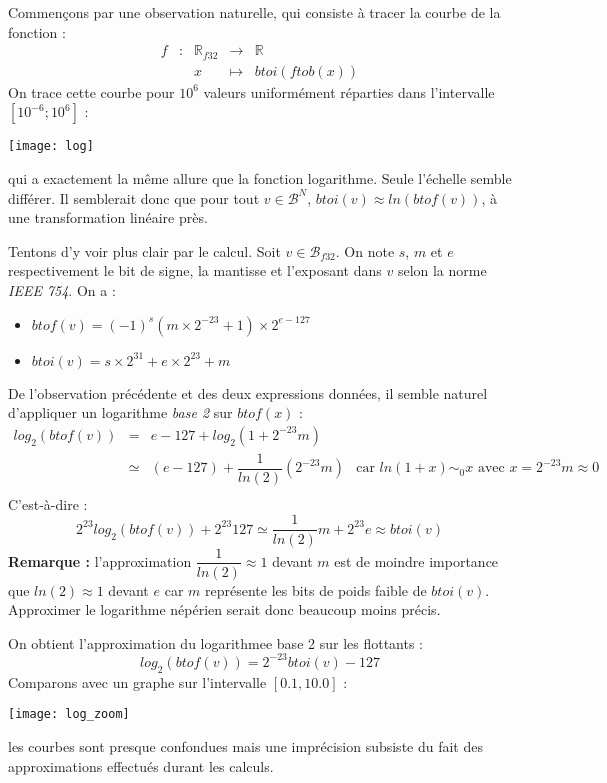 \documentclass[../../main.tex]{subfiles}
\begin{document}
Commençons par une observation naturelle, qui consiste à tracer la courbe de la fonction :
$$
\begin{array}{lclcl}
f & : & \mathbb{R}_{f32} & \rightarrow & \mathbb{R} \\
     &   & x & \mapsto & btoi(ftob(x))
\end{array}
$$
On trace cette courbe pour $10^6$ valeurs uniformément réparties dans l'intervalle $[10^{-6}; 10^6]$ :
\begin{center}
  \texttt{[image: log]}
\end{center}
qui a exactement la même allure que la fonction logarithme. Seule l'échelle semble différer. Il semblerait donc que pour tout $v\in\mathcal{B}^{N}$, $btoi(v)\approx ln(btof(v))$, à une transformation linéaire près.

Tentons d'y voir plus clair par le calcul. Soit $v\in\mathcal{B}_{f32}$. On note $s$, $m$ et $e$ respectivement le bit de signe, la mantisse et l'exposant dans $v$ selon la norme \textit{IEEE 754}. On a :
\begin{itemize}
  \item $btof(v) = (-1)^{s}(m\times{2^{-23}} + 1)\times{2^{e-127}}$
  \item $btoi(v) = s\times{2^{31}} + e\times{2^23} + m$
\end{itemize}
De l'observation précédente et des deux expressions données, il semble naturel d'appliquer un logarithme \textit{base 2} sur $btof(x)$ :
$$\begin{array}{lcll}
log_2(btof(v)) & = & e - 127 + log_2\left(1 + 2^{-23}m\right) \\
& \simeq & (e - 127) + \dfrac{1}{ln(2)}\left(2^{-23}m\right) & \text{car $ln(1 + x)\sim_0 x$ avec $x = 2^{-23}m\approx{0}$} \\

\end{array}$$
C'est-à-dire :
$$2^{23}log_2(btof(v)) + 2^{23}127\simeq \dfrac{1}{ln(2)}m + 2^{23}e\approx{btoi(v)}$$
\textbf{Remarque :} l'approximation $\dfrac{1}{ln(2)}\approx 1$ devant $m$ est de moindre importance que $ln(2)\approx 1$ devant $e$ car $m$ représente les bits de poids faible de $btoi(v)$. Approximer le logarithme népérien serait donc beaucoup moins précis.

On obtient l'approximation du logarithmee base 2 sur les flottants :
$$log_2(btof(v)) = 2^{-23}btoi(v) - 127$$
Comparons avec un graphe sur l'intervalle $[0.1, 10.0]$ :
\begin{center}
  \texttt{[image: log\_zoom]}
\end{center}
les courbes sont presque confondues mais une imprécision subsiste du fait des approximations effectués durant les calculs. 
\end{document}
